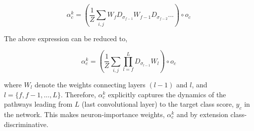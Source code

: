 {\begin{ceqn}
\begin{equation}
 \alpha_c^k = (\frac{1}{Z} \sum_{i,j} W_f D_{\sigma_{f-1}} W_{f-1} D_{\sigma_{f-2}}...)\circ o_c
\end{equation}
\end{ceqn}
The above expression can be reduced to,
\begin{ceqn}
\begin{equation}
 \alpha_c^k = (\frac{1}{Z} \sum_{i,j} \prod_{l=f}^L D_{\sigma_{l-1}} W_{l}) \circ o_c
\end{equation}
\end{ceqn}
where $W_{l}$ denote the weights connecting layers $(l-1)$ and $l$, and $l = \{ f, f-1, ..., L \}$.
Therefore, $\alpha_c^k$ explicitly captures the dynamics of the pathways leading from $L$ (last convolutional layer) to the target class score, $y_c$ in the network.
This makes neuron-importance weights, $\alpha_c^k$ and by extension \gcam{} class-discriminative.}










